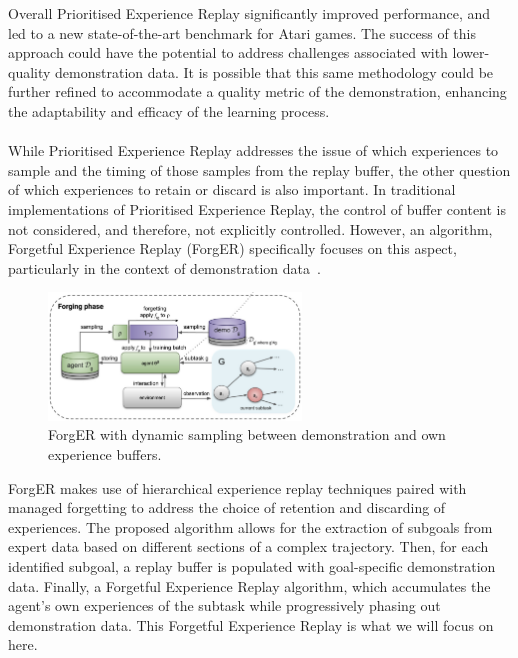 Overall Prioritised Experience Replay significantly improved performance, and led to a new state-of-the-art benchmark for Atari games.
The success of this approach could have the potential to address challenges associated with lower-quality demonstration data.
It is possible that this same methodology could be further refined to accommodate a quality metric of the demonstration, enhancing the adaptability and efficacy of the learning process. \\\\



While Prioritised Experience Replay addresses the issue of which experiences to sample and the timing of those samples from the replay buffer, the other question of which experiences to retain or discard is also important. 
In traditional implementations of Prioritised Experience Replay, the control of buffer content is not considered, and therefore, not explicitly controlled. 
However, an algorithm, Forgetful Experience Replay (ForgER) specifically focuses on this aspect, particularly in the context of demonstration data~\cite{fyp16-forgetful-experience-replay}.

\begin{figure}[htbp]
  \centering
  \includegraphics[width=0.6\textwidth]{background/fyp16-forger-arch.png}
  \caption{ForgER with dynamic sampling between demonstration and own experience buffers.}
\label{fig:fyp16-forger-arch}
\end{figure}

ForgER makes use of hierarchical experience replay techniques paired with managed forgetting to address the choice of retention and discarding of experiences. 
The proposed algorithm allows for the extraction of subgoals from expert data based on different sections of a complex trajectory. 
Then, for each identified subgoal, a replay buffer is populated with goal-specific demonstration data. 
Finally, a Forgetful Experience Replay algorithm, which accumulates the agent's own experiences of the subtask while progressively phasing out demonstration data.
This Forgetful Experience Replay is what we will focus on here.

